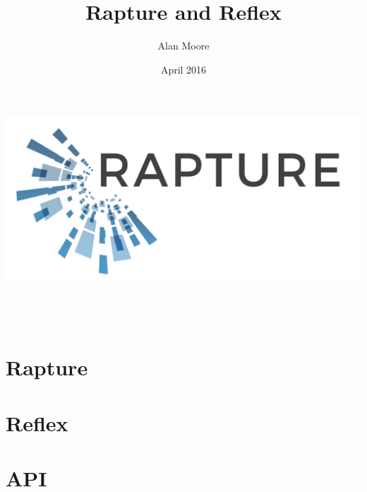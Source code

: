 \documentclass[12pt,twoside,a4paper]{book}
\begin{document}
\title{Rapture and Reflex}
\author{Alan Moore}
\date{April 2016}

\makeatletter
    \begin{titlepage}
      \includegraphics[width=0.7\linewidth]{Graphics/RaptureLogo.png}\\[4ex]
        \begin{center}
            {\huge \bfseries  \@title }\\[2ex]
            {\LARGE  \@author}\\[50ex]
            {\large \@date}
        \end{center}
    \end{titlepage}
\makeatother
\thispagestyle{empty}
\newpage


\setcounter{tocdepth}{1}
\tableofcontents
\setcounter{page}{1} %


\part{Rapture}




\part{Reflex}
















\part{API}
\end{document}
